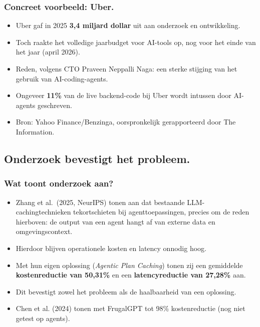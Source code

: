 \documentclass[aspectratio=169]{beamer}
\begin{document}
\begin{frame}
    \frametitle{Concreet voorbeeld: Uber.}

    \begin{itemize}
        \item Uber gaf in 2025 \textbf{3,4 miljard dollar} uit aan
            onderzoek en ontwikkeling.
        \item Toch raakte het volledige jaarbudget voor AI-tools op,
            nog voor het einde van het jaar (april 2026).
        \item Reden, volgens CTO Praveen Neppalli Naga: een sterke
            stijging van het gebruik van AI-coding-agents.
        \item Ongeveer \textbf{11\%} van de live backend-code bij Uber
            wordt intussen door AI-agents geschreven.
        \item Bron: Yahoo Finance/Benzinga, oorspronkelijk gerapporteerd
            door The Information.
    \end{itemize}
\end{frame}

\subsection{Onderzoek bevestigt het probleem.}

\begin{frame}
    \frametitle{Wat toont onderzoek aan?}

    \begin{itemize}
        \item Zhang et al.\ (2025, NeurIPS) tonen aan dat bestaande
            LLM-cachingtechnieken tekortschieten bij agenttoepassingen,
            precies om de reden hierboven: de output van een agent hangt
            af van externe data en omgevingscontext. 
        \item Hierdoor blijven operationele kosten en latency onnodig
            hoog.
        \item Met hun eigen oplossing (\emph{Agentic Plan Caching})
            tonen zij een gemiddelde \textbf{kostenreductie van 50,31\%}
            en een \textbf{latencyreductie van 27,28\%} aan.
        \item Dit bevestigt zowel het probleem als de haalbaarheid van
            een oplossing.
	\item Chen et al. (2024) tonen met FrugalGPT tot 98\% kostenreductie (nog niet getest op agents).
    \end{itemize}
\end{frame}
\end{document}
